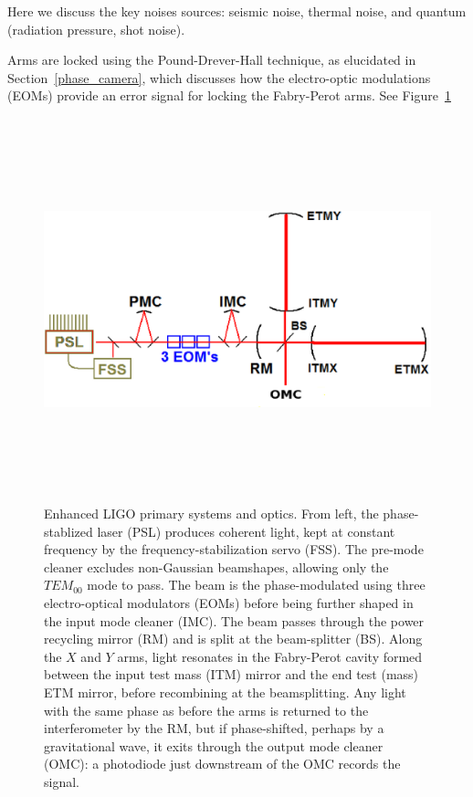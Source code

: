                 Here we discuss the key noises sources: seismic noise, thermal noise, and quantum (radiation pressure, shot noise).

                Arms are locked using the Pound-Drever-Hall technique, as elucidated in Section~\ref{phase_camera}, which discusses how the electro-optic modulations (EOMs) provide an error signal for locking the Fabry-Perot arms.
See Figure~\ref{primary_eLIGO_optics}

\begin{figure}
\begin{center}
\includegraphics[height=111mm,width=148mm]{LIGODiagramnew.eps}
\caption{Enhanced LIGO primary systems and optics. From left, the phase-stablized laser (PSL) produces coherent light, kept at constant frequency by the frequency-stabilization servo (FSS). The pre-mode cleaner excludes non-Gaussian beamshapes, allowing only the $TEM_{00}$ mode to pass. The beam is the phase-modulated using three electro-optical modulators (EOMs) before being further shaped in the input mode cleaner (IMC). The beam passes through the power recycling mirror (RM) and is split at the beam-splitter (BS). Along the $X$ and $Y$ arms, light resonates in the Fabry-Perot cavity formed between the input test mass (ITM) mirror and the end test (mass) ETM mirror, before recombining at the beamsplitting. Any light with the same phase as before the arms is returned to the interferometer by the RM, but if phase-shifted, perhaps by a gravitational wave, it exits through the output mode cleaner (OMC): a photodiode just downstream of the OMC records the signal.}
\label{primary_eLIGO_optics}
\end{center}
\end{figure}

